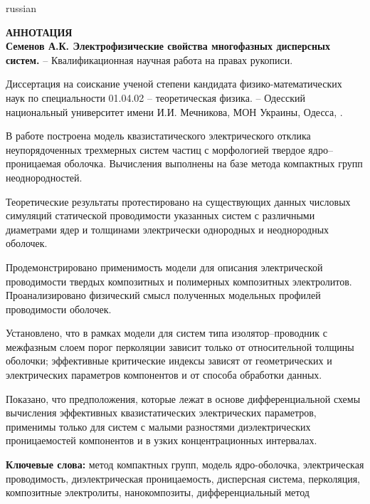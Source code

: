 \documentclass[twoside,a4paper,14pt]{vakaref-utf8}
\begin{document}
\begin{otherlanguage*}{russian}
\begin{center}
	{\normalfont \textbf{
			АННОТАЦИЯ\\
			Семенов А.К. Электрофизические свойства многофазных дисперсных систем.} -- Квалификационная научная работа на правах рукописи.}
\end{center}
\vskip 5pt
	
Диссертация на соискание ученой степени кандидата физико-матема\-тических наук по специальности 01.04.02 -- теоретическая физика. -- Одесский национальный университет имени И.И. Мечникова, МОН Украины, Одесса, \the\year.

\vskip 5pt

В работе построена модель квазистатического электрического отклика неупорядоченных трехмерных систем частиц с морфологией твердое ядро--проницаемая оболочка. Вычисления выполнены на базе метода компактных групп неоднородностей.

Теоретические результаты протестировано на существующих данных числовых симуляций статической проводимости указанных систем с различными диаметрами ядер и толщинами электрически однородных и неоднородных оболочек.

Продемонстрировано применимость модели для описания электрической проводимости твердых композитных и полимерных композитных электролитов. Проанализировано физический смысл полученных модельных профилей проводимости оболочек.

Установлено, что в рамках модели для систем типа изолятор--проводник с межфазным слоем порог перколяции зависит только от относительной толщины оболочки; эффективные критические индексы зависят от геометрических и электрических параметров компонентов и от способа обработки данных.

Показано, что предположения, которые лежат в основе дифференциальной схемы вычисления эффективных квазистатических электрических параметров, применимы только для систем с малыми разностями диэлектрических проницаемостей компонентов и в узких концентрационных интервалах.

\vskip 10pt
\textbf{Ключевые слова:} метод компактных групп, модель ядро-оболочка, электрическая проводимость, диэлектрическая проницаемость, дисперсная система, перколяция, композитные электролиты, нанокомпозиты, дифференциальный метод
	
\end{otherlanguage*}
\end{document}

